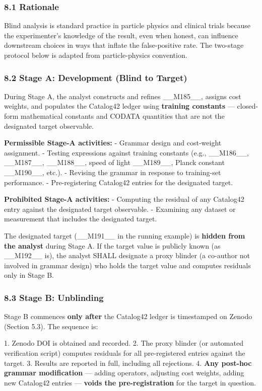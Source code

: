 \subsubsection{8.1 Rationale}

Blind analysis is standard practice in particle physics and clinical trials because the experimenter's knowledge of the result, even when honest, can influence downstream choices in ways that inflate the false-positive rate. The two-stage protocol below is adapted from particle-physics convention.

\subsubsection{8.2 Stage A: Development (Blind to Target)}

During Stage A, the analyst constructs and refines \_\_M185\_\_, assigns cost weights, and populates the Catalog42 ledger using \textbf{training constants} --- closed-form mathematical constants and CODATA quantities that are not the designated target observable.

\textbf{Permissible Stage-A activities:}
- Grammar design and cost-weight assignment.
- Testing expressions against training constants (e.g., \_\_M186\_\_, \_\_M187\_\_, \_\_M188\_\_, speed of light \_\_M189\_\_, Planck constant \_\_M190\_\_, etc.).
- Revising the grammar in response to training-set performance.
- Pre-registering Catalog42 entries for the designated target.

\textbf{Prohibited Stage-A activities:}
- Computing the residual of any Catalog42 entry against the designated target observable.
- Examining any dataset or measurement that includes the designated target.

The designated target (\_\_M191\_\_ in the running example) is \textbf{hidden from the analyst} during Stage A. If the target value is publicly known (as \_\_M192\_\_ is), the analyst SHALL designate a proxy blinder (a co-author not involved in grammar design) who holds the target value and computes residuals only in Stage B.

\subsubsection{8.3 Stage B: Unblinding}

Stage B commences \textbf{only after} the Catalog42 ledger is timestamped on Zenodo (Section 5.3). The sequence is:

1. Zenodo DOI is obtained and recorded.
2. The proxy blinder (or automated verification script) computes residuals for all pre-registered entries against the target.
3. Results are reported in full, including all rejections.
4. \textbf{Any post-hoc grammar modification} --- adding operators, adjusting cost weights, adding new Catalog42 entries --- \textbf{voids the pre-registration} for the target in question.

